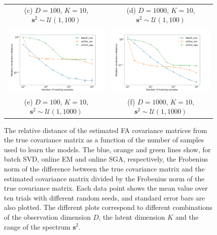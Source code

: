 \documentclass[msc,deptreport.inf]{infthesis} %
\newcommand{\matr}[1]{\mathbf{#1}}
\begin{document}
\begin{figure}[!htbp]
\begin{tabular}{cc}
		 (c) $D=100$, $K=10$, $\matr{s}^2 \sim \mathcal{U}(1, 100)$ 
		 & (d) $D=1000$, $K=10$, $\matr{s}^2 \sim \mathcal{U}(1, 100)$\\[6pt]
		 \includegraphics[width=70mm]{plots/online_fa_covar_distance__observation_dim=100__latent_dim=10__spectrum_min=1__spectrum_max=1000.png}
		 & \includegraphics[width=70mm]{plots/online_fa_covar_distance__observation_dim=1000__latent_dim=10__spectrum_min=1__spectrum_max=1000.png} \\
		 (e) $D=100$, $K=10$, $\matr{s}^2 \sim \mathcal{U}(1, 1000)$ 
		 & (f) $D=1000$, $K=10$, $\matr{s}^2 \sim \mathcal{U}(1, 1000)$\\[6pt]
	\end{tabular}
	\caption{The relative distance of the estimated FA covariance matrices from the true covariance matrix as a function of the number of samples used to learn the models. The blue, orange and green lines show, for batch SVD, online EM and online SGA, respectively, the Frobenius norm of the difference between the true covariance matrix and the estimated covariance matrix divided by the Frobenius norm of the true covariance matrix. Each data point shows the mean value over ten trials with different random seeds, and standard error bars are also plotted. The different plots correspond to different combinations of the observation dimension $D$, the latent dimension $K$ and the range of the spectrum $\matr{s}^2$.} 
	\label{fig:fa_covar_distance}
\end{figure}
\end{document}
